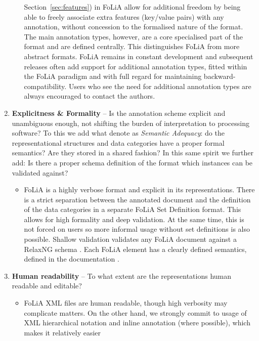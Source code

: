 \documentclass[a4paper,10pt,twoside]{article}
\begin{document}
\begin{enumerate}
\begin{itemize}
      Section~\ref{sec:features}) in FoLiA allow for additional freedom by
      being able to freely associate extra features (key/value pairs) with any
      annotation, without concession to the formalised nature of the format.
      The main annotation types, however, are a core specialised part of the format and are
      defined centrally. This distinguishes FoLiA from more abstract formats.
      FoLiA remains in constant development and subsequent releases often add
      support for additional annotation types, fitted within the FoLiA paradigm
      and with full regard for maintaining backward-compatibility. Users who
      see the need for additional annotation types are always encouraged to
      contact the authors.
  \end{itemize}
\item \textbf{Explicitness \& Formality} -- Is the annotation scheme explicit
  and unambiguous enough, not shifting the burden of interpretation to
  processing software? To this we add what  denote as
  \emph{Semantic Adequacy}: do the representational structures and data
  categories have a proper formal semantics? Are they stored in a shared
  fashion? In this same spirit we further add: Is there a proper schema definition of the
  format which instances can be validated against?
  \begin{itemize}
    \item[] FoLiA is a highly verbose format and explicit in its representations.
      There is a strict separation between the annotated document and the
      definition of the data categories in a separate FoLiA Set Definition
      format. This allows for high formality and deep validation. At the same
      time, this is not forced on users so more informal usage without set
      definitions is also possible. Shallow validation validates any FoLiA
      document against a RelaxNG schema \cite{RELAXNG}. Each FoLiA element has a clearly
      defined semantics, defined in the documentation \cite{FOLIA}.
  \end{itemize}
\item \textbf{Human readability} -- To what extent are the representations human readable and editable?
\begin{itemize}
    \item[] FoLiA XML files are human readable, though high verbosity may
      complicate matters. On the other hand, we strongly commit to usage of XML hierarchical notation
      and inline annotation (where possible), which makes it relatively easier

\end{itemize}
\end{enumerate}
\end{document}
